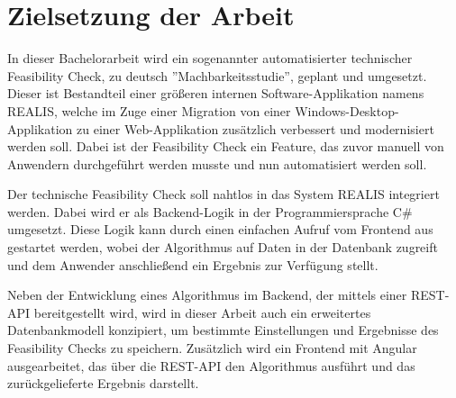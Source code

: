 \section{Zielsetzung der Arbeit}
In dieser Bachelorarbeit wird ein sogenannter automatisierter technischer Feasibility Check, zu deutsch ''Machbarkeitsstudie'', geplant und umgesetzt. Dieser ist Bestandteil einer größeren internen Software-Applikation namens \gls{REALIS}, welche
im Zuge einer Migration von einer Windows-Desktop-Applikation zu einer Web-Applikation zusätzlich verbessert und modernisiert werden soll. Dabei ist der Feasibility Check ein Feature, das zuvor manuell von Anwendern durchgeführt werden musste und nun automatisiert werden soll.

Der technische Feasibility Check soll nahtlos in das System \gls{REALIS} integriert werden. Dabei wird er als Backend-Logik in der Programmiersprache C\# umgesetzt. Diese Logik kann durch einen einfachen Aufruf vom Frontend aus gestartet werden, wobei der Algorithmus auf Daten in der Datenbank zugreift und dem Anwender anschließend ein Ergebnis zur Verfügung stellt.

Neben der Entwicklung eines Algorithmus im Backend, der mittels einer REST-API bereitgestellt wird, wird in dieser Arbeit auch ein erweitertes Datenbankmodell konzipiert, um bestimmte Einstellungen und Ergebnisse des Feasibility Checks zu speichern. Zusätzlich wird ein Frontend mit Angular ausgearbeitet, das über die REST-API den Algorithmus ausführt und das zurückgelieferte Ergebnis darstellt.